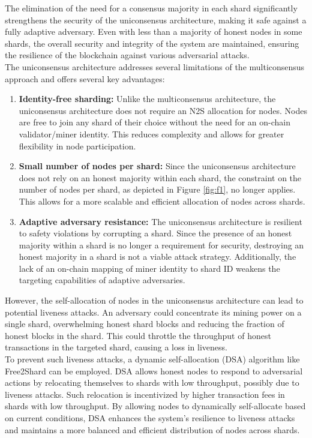 \documentclass{report}
\begin{document}
The elimination of the need for a consensus majority in each shard significantly strengthens the security of the uniconsensus architecture, making it safe against a fully adaptive adversary. Even with less than a majority of honest nodes in some shards, the overall security and integrity of the system are maintained, ensuring the resilience of the blockchain against various adversarial attacks.\\
The uniconsensus architecture addresses several limitations of the multiconsensus approach and offers several key advantages:
\begin{enumerate}
	\item \textbf{Identity-free sharding:} Unlike the multiconsensus architecture, the uniconsensus architecture does not require an N2S allocation for nodes. Nodes are free to join any shard of their choice without the need for an on-chain validator/miner identity. This reduces complexity and allows for greater flexibility in node participation.
	\item \textbf{Small number of nodes per shard:} Since the uniconsensus architecture does not rely on an honest majority within each shard, the constraint on the number of nodes per shard, as depicted in Figure \ref{fig:f1}, no longer applies. This allows for a more scalable and efficient allocation of nodes across shards.
	\item \textbf{Adaptive adversary resistance:} The uniconsensus architecture is resilient to safety violations by corrupting a shard. Since the presence of an honest majority within a shard is no longer a requirement for security, destroying an honest majority in a shard is not a viable attack strategy. Additionally, the lack of an on-chain mapping of miner identity to shard ID weakens the targeting capabilities of adaptive adversaries.
\end{enumerate}
However, the self-allocation of nodes in the uniconsensus architecture can lead to potential liveness attacks. An adversary could concentrate its mining power on a single shard, overwhelming honest shard blocks and reducing the fraction of honest blocks in the shard. This could throttle the throughput of honest transactions in the targeted shard, causing a loss in liveness.\\
To prevent such liveness attacks, a dynamic self-allocation (DSA) algorithm like Free2Shard can be employed. DSA allows honest nodes to respond to adversarial actions by relocating themselves to shards with low throughput, possibly due to liveness attacks. Such relocation is incentivized by higher transaction fees in shards with low throughput. By allowing nodes to dynamically self-allocate based on current conditions, DSA enhances the system's resilience to liveness attacks and maintains a more balanced and efficient distribution of nodes across shards.
\end{document}
